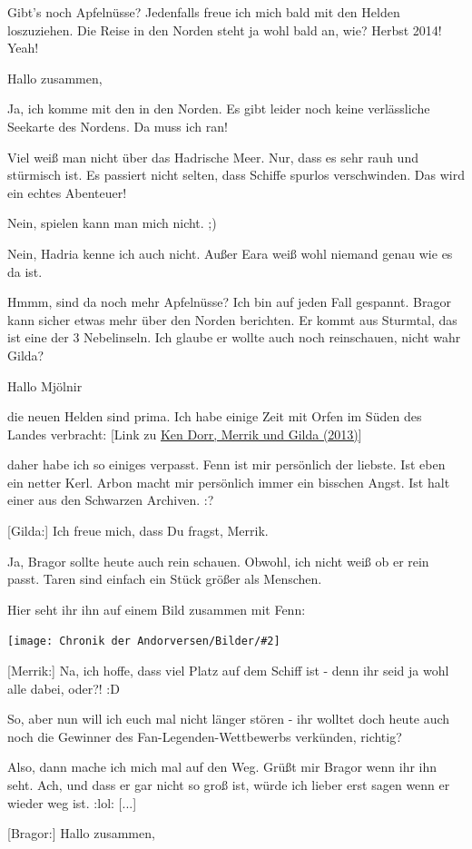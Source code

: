 \documentclass[10pt, a4paper, oneside]{book}
\newcommand{\refstorytext}[1]{\hyperref[Storytext: #1]{#1}}
\newcommand{\bildmitts}[2][height=0.32\textwidth,width=0.48\textwidth,keepaspectratio]{%
    \begin{center}
        \texttt{[image: Chronik der Andorversen/Bilder/\#2]}
    \end{center}
}
\begin{document}
\begin{multicols}{2}
Gibt's noch Apfelnüsse? Jedenfalls freue ich mich bald mit den Helden loszuziehen. Die Reise in den Norden steht ja wohl bald an, wie? Herbst 2014! Yeah!

Hallo zusammen,

Ja, ich komme mit den in den Norden. Es gibt leider noch keine verlässliche Seekarte des Nordens. Da muss ich ran!

Viel weiß man nicht über das Hadrische Meer. Nur, dass es sehr rauh und stürmisch ist. Es passiert nicht selten, dass Schiffe spurlos verschwinden. Das wird ein echtes Abenteuer!

Nein, spielen kann man mich nicht. ;)

Nein, Hadria kenne ich auch nicht. Außer Eara weiß wohl niemand genau wie es da ist.

Hmmm, sind da noch mehr Apfelnüsse? Ich bin auf jeden Fall gespannt. Bragor kann sicher etwas mehr über den Norden berichten. Er kommt aus Sturmtal, das ist eine der 3 Nebelinseln. Ich glaube er wollte auch noch reinschauen, nicht wahr Gilda?

Hallo Mjölnir

die neuen Helden sind prima. Ich habe einige Zeit mit Orfen im Süden des Landes verbracht: [Link zu \refstorytext{Ken Dorr, Merrik und Gilda (2013)}]

daher habe ich so einiges verpasst. Fenn ist mir persönlich der liebste. Ist eben ein netter Kerl. Arbon macht mir persönlich immer ein bisschen Angst. Ist halt einer aus den Schwarzen Archiven. :?


[Gilda:] Ich freue mich, dass Du fragst, Merrik.

Ja, Bragor sollte heute auch rein schauen. Obwohl, ich nicht weiß ob er rein passt. Taren sind einfach ein Stück größer als Menschen.

Hier seht ihr ihn auf einem Bild zusammen mit Fenn:

\bildmitts{Fenn Bragor.jpeg}

[Merrik:] Na, ich hoffe, dass viel Platz auf dem Schiff ist - denn ihr seid ja wohl alle dabei, oder?! :D

So, aber nun will ich euch mal nicht länger stören - ihr wolltet doch heute auch noch die Gewinner des Fan-Legenden-Wettbewerbs verkünden, richtig?

Also, dann mache ich mich mal auf den Weg. Grüßt mir Bragor wenn ihr ihn seht. Ach, und dass er gar nicht so groß ist, würde ich lieber erst sagen wenn er wieder weg ist. :lol: [...]

[Bragor:] Hallo zusammen,


\end{multicols}
\end{document}
